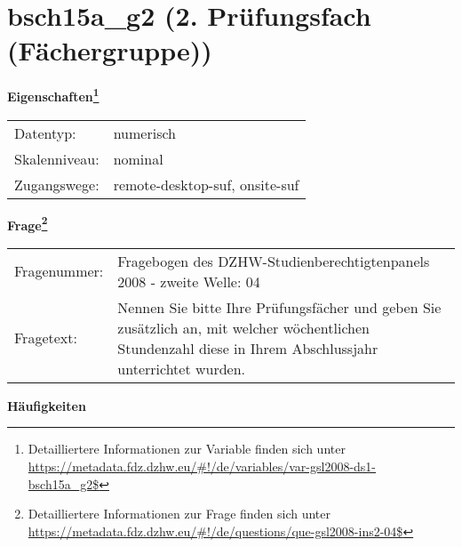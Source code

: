 
    \setcounter{footnote}{0}

    \vspace*{-1.8cm}
	\section{bsch15a\_g2 (2. Prüfungsfach (Fächergruppe))}
	\label{section:bsch15a_g2}



    \vspace*{0.5cm}
    \noindent\textbf{Eigenschaften\footnote{Detailliertere Informationen zur Variable finden sich unter
		\url{https://metadata.fdz.dzhw.eu/\#!/de/variables/var-gsl2008-ds1-bsch15a_g2$}}}\\
	\begin{tabularx}{\hsize}{@{}lX}
	Datentyp: & numerisch \\
	Skalenniveau: & nominal \\
	Zugangswege: &
	  remote-desktop-suf, 
	  onsite-suf
 \\
    \end{tabularx}



				\vspace*{0.5cm}
                \noindent\textbf{Frage\footnote{Detailliertere Informationen zur Frage finden sich unter
		              \url{https://metadata.fdz.dzhw.eu/\#!/de/questions/que-gsl2008-ins2-04$}}}\\
				\begin{tabularx}{\hsize}{@{}lX}
					Fragenummer: &
					  Fragebogen des DZHW-Studienberechtigtenpanels 2008 - zweite Welle:
					  04
 \\
					Fragetext: & Nennen Sie bitte Ihre Prüfungsfächer und geben Sie zusätzlich an, mit welcher wöchentlichen Stundenzahl diese in Ihrem Abschlussjahr unterrichtet wurden. \\
				\end{tabularx}





        		\vspace*{0.5cm}
                \noindent\textbf{Häufigkeiten}

